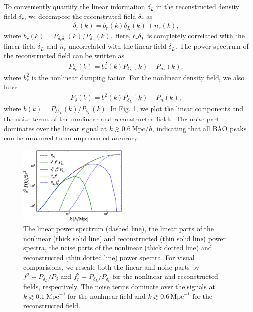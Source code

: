 \documentclass[aps,prd,twocolumn,showpacs,superscriptaddress,groupedaddress,nofootinbib]{revtex4}  %
\newcommand{\mr}{\mathrm}
\newcommand{\bea}{\begin{eqnarray}}
\newcommand{\eea}{\end{eqnarray}}
\begin{document}
To conveniently quantify the linear information $\delta_L$ in the reconstructed
density field $\delta_r$, we decompose the reconstruted field $\delta_r$ as
\bea
\delta_r(k)=b_r(k)\delta_L(k)+n_r(k),
\eea
where $b_r(k)=P_{\delta_r\delta_L}(k)/P_{\delta_L}(k)$. 
Here, $b_r\delta_L$ is completely correlated with the linear field $\delta_L$ 
and $n_r$ uncorrelated with the linear field $\delta_L$.
The power spectrum of the reconstructed field can be written as
\bea
P_{\delta_r}(k)=b_r^2(k)P_{\delta_L}(k)+P_{n_r}(k),
\eea
where $b_r^2$ is the nonlinear damping factor. 
For the nonlinear density field, we also have
\bea
P_{\delta}(k)=b^2(k)P_{\delta_L}(k)+P_{n}(k),
\eea
where $b(k)=P_{\delta\delta_L}(k)/P_{\delta_L}(k)$. 
In Fig. \ref{fig:ps}, we plot the linear components and the noise terms of the
nonlinear and reconstructed fields. The noise part dominates over the linear 
signal at $k\gtrsim0.6\ \mr{Mpc}/h$, indicating that all BAO peaks can be 
measured to an unprecented accuracy.

\begin{figure}[tbp]
\begin{center}
\includegraphics[width=0.48\textwidth]{fb.eps}
\end{center}
\vspace{-0.7cm}
\caption{The linear power spectrum (dashed line), the linear parts of the
nonlinear (thick solid line) and reconstructed (thin solid line) power spectra,
the noise parts of the nonlinear (thick dotted line) and reconstructed
(thin dotted line) power spectra.
For visual comparisions, we rescale both the linear and noise parts by
$f^2=P_{\delta_L}/P_{\delta}$ and $f^2_r=P_{\delta_L}/P_{\delta_r}$ for the nonlinear and reconstructed fields, respectively.
The noise terms dominate over the signals at
$k\gtrsim0.1\ \mr{Mpc}^{-1}$ for the nonlinear field and $k\gtrsim0.6\ \mr{Mpc}^{-1}$
for the reconstructed field.}
\label{fig:ps}
\end{figure}
\end{document}
